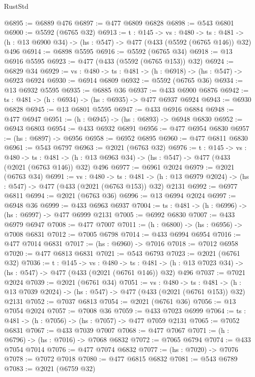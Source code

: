 \begin{lexlean}{RustStd}
\begin{coremodule}
@6895 := @6889 @476
@6897 := @477 @6809 @6828
@6898 := @543 @6801
@6900 := @5592 (@6765 @32)
@6913 := {t : @145} ->
  {vs : @480} ->
  {ts : @481} -> (h : @13 @6900 @34) -> (hs : @547) -> @477 (@433 (@5592 (@6765 @146)) @32) @496
@6914 := @6898 @5595
@6916 := @5592 (@6765 @34)
@6918 := @13 @6916 @5595
@6923 := @477 (@433 (@5592 (@6765 @153)) @32)
@6924 := @6829 @34
@6929 := {vs : @480} -> {ts : @481} -> (h : @6918) -> (hs : @547) -> @6923 @6924
@6930 := @6914 @6809
@6932 := @5592 (@6765 @36)
@6934 := @13 @6932 @5595
@6935 := @6885 @36
@6937 := @433 @6900 @6876
@6942 := {ts : @481} -> (h : @6934) -> (hs : @6935) -> @477 @6937 @6924
@6943 := @6930 @6828
@6945 := @13 @6801 @5595
@6947 := @433 @6916 @6884
@6948 := @477 @6947
@6951 := (h : @6945) -> (hs : @6893) -> @6948 @6830
@6952 := @6943 @6803
@6954 := @433 @6932 @6891
@6956 := @477 @6954 @6830
@6957 := (hs : @6897) -> @6956
@6958 := @6952 @6895
@6960 := @477 @6811 @6830
@6961 := @543 @6797
@6963 := @2021 (@6763 @32)
@6976 := {t : @145} ->
  {vs : @480} ->
  {ts : @481} -> (h : @13 @6963 @34) -> (hs : @547) -> @477 (@433 (@2021 (@6763 @146)) @32) @496
@6977 := @6961 @2024
@6979 := @2021 (@6763 @34)
@6991 := {vs : @480} ->
  {ts : @481} -> (h : @13 @6979 @2024) -> (hs : @547) -> @477 (@433 (@2021 (@6763 @153)) @32) @2131
@6992 := @6977 @6811
@6994 := @2021 (@6763 @36)
@6996 := @13 @6994 @2024
@6997 := @6948 @36
@6999 := @433 @6963 @6937
@7004 := {ts : @481} -> (h : @6996) -> (hs : @6997) -> @477 @6999 @2131
@7005 := @6992 @6830
@7007 := @433 @6979 @6947
@7008 := @477 @7007
@7011 := (h : @6800) -> (hs : @6956) -> @7008 @6831
@7012 := @7005 @6798
@7014 := @433 @6994 @6954
@7016 := @477 @7014 @6831
@7017 := (hs : @6960) -> @7016
@7018 := @7012 @6958
@7020 := @477 @6813 @6831
@7021 := @543 @6793
@7023 := @2021 (@6761 @32)
@7036 := {t : @145} ->
  {vs : @480} ->
  {ts : @481} -> (h : @13 @7023 @34) -> (hs : @547) -> @477 (@433 (@2021 (@6761 @146)) @32) @496
@7037 := @7021 @2024
@7039 := @2021 (@6761 @34)
@7051 := {vs : @480} ->
  {ts : @481} -> (h : @13 @7039 @2024) -> (hs : @547) -> @477 (@433 (@2021 (@6761 @153)) @32) @2131
@7052 := @7037 @6813
@7054 := @2021 (@6761 @36)
@7056 := @13 @7054 @2024
@7057 := @7008 @36
@7059 := @433 @7023 @6999
@7064 := {ts : @481} -> (h : @7056) -> (hs : @7057) -> @477 @7059 @2131
@7065 := @7052 @6831
@7067 := @433 @7039 @7007
@7068 := @477 @7067
@7071 := (h : @6796) -> (hs : @7016) -> @7068 @6832
@7072 := @7065 @6794
@7074 := @433 @7054 @7014
@7076 := @477 @7074 @6832
@7077 := (hs : @7020) -> @7076
@7078 := @7072 @7018
@7080 := @477 @6815 @6832
@7081 := @543 @6789
@7083 := @2021 (@6759 @32)

\end{coremodule}
\end{lexlean}
